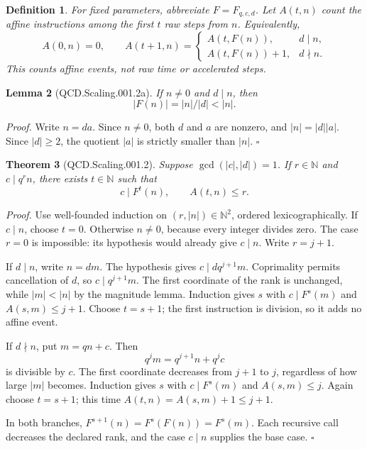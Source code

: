 \documentclass[11pt,letterpaper]{article}
\newcommand{\N}{\mathbb{N}}
\newtheorem{theorem}{Theorem}
\newtheorem{lemma}[theorem]{Lemma}
\newtheorem{definition}[theorem]{Definition}
\newenvironment{proof}{\noindent\textit{Proof.}}{\hfill\(\square\)}
\begin{document}
\begin{definition}
For fixed parameters, abbreviate \(F=F_{q,c,d}\). Let \(A(t,n)\) count the affine
instructions among the first \(t\) raw steps from \(n\). Equivalently,
\[
A(0,n)=0,\qquad
A(t+1,n)=
\begin{cases}
A(t,F(n)),&d\mid n,\\
A(t,F(n))+1,&d\nmid n.
\end{cases}
\]
This counts affine events, not raw time or accelerated steps.
\end{definition}

\begin{lemma}[QCD.Scaling.001.2a]
If \(n\ne0\) and \(d\mid n\), then
\[
|F(n)|=|n|/|d|<|n|.
\]
\end{lemma}
\begin{proof}
Write \(n=da\). Since \(n\ne0\), both \(d\) and \(a\) are nonzero, and
\(|n|=|d||a|\). Since \(|d|\ge2\), the quotient \(|a|\) is strictly smaller than
\(|n|\).
\end{proof}

\begin{theorem}[QCD.Scaling.001.2]
Suppose \(\gcd(|c|,|d|)=1\). If \(r\in\N\) and \(c\mid q^r n\), there exists
\(t\in\N\) such that
\[
c\mid F^t(n),\qquad A(t,n)\le r.
\]
\end{theorem}
\begin{proof}
Use well-founded induction on \((r,|n|)\in\N^2\), ordered lexicographically.
If \(c\mid n\), choose \(t=0\). Otherwise \(n\ne0\), because every integer divides
zero. The case \(r=0\) is impossible: its hypothesis would already give
\(c\mid n\). Write \(r=j+1\).

If \(d\mid n\), write \(n=dm\). The hypothesis gives
\(c\mid d q^{j+1}m\). Coprimality permits cancellation of \(d\), so
\(c\mid q^{j+1}m\). The first coordinate of the rank is unchanged, while
\(|m|<|n|\) by the magnitude lemma. Induction gives \(s\) with
\(c\mid F^s(m)\) and \(A(s,m)\le j+1\). Choose \(t=s+1\); the first instruction
is division, so it adds no affine event.

If \(d\nmid n\), put \(m=qn+c\). Then
\[
q^j m=q^{j+1}n+q^j c
\]
is divisible by \(c\). The first coordinate decreases from \(j+1\) to \(j\),
regardless of how large \(|m|\) becomes. Induction gives \(s\) with
\(c\mid F^s(m)\) and \(A(s,m)\le j\). Again choose \(t=s+1\); this time
\(A(t,n)=A(s,m)+1\le j+1\).

In both branches, \(F^{s+1}(n)=F^s(F(n))=F^s(m)\). Each recursive call decreases
the declared rank, and the case \(c\mid n\) supplies the base case.
\end{proof}
\end{document}

